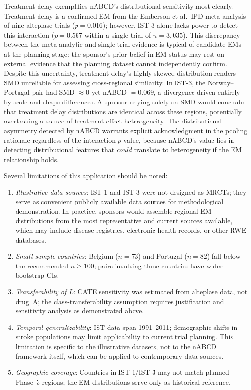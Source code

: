 \documentclass[AMA,Times1COL]{WileyNJDv5}
\begin{document}
Treatment delay exemplifies nABCD's distributional sensitivity most clearly. Treatment delay is a confirmed EM from the Emberson et al.\ IPD meta-analysis of nine alteplase trials ($p = 0.016$); however, IST-3 alone lacks power to detect this interaction ($p = 0.567$ within a single trial of $n = 3{,}035$). This discrepancy between the meta-analytic and single-trial evidence is typical of candidate EMs at the planning stage: the sponsor's prior belief in EM status may rest on external evidence that the planning dataset cannot independently confirm. Despite this uncertainty, treatment delay's highly skewed distribution renders SMD unreliable for assessing cross-regional similarity. In IST-3, the Norway--Portugal pair had SMD $\approx 0$ yet nABCD $= 0.069$, a divergence driven entirely by scale and shape differences. A sponsor relying solely on SMD would conclude that treatment delay distributions are identical across these regions, potentially overlooking a source of treatment effect heterogeneity. The distributional asymmetry detected by nABCD warrants explicit acknowledgment in the pooling rationale regardless of the interaction $p$-value, because nABCD's value lies in detecting distributional features that \emph{could} translate to heterogeneity if the EM relationship holds.

Several limitations of this application should be noted:
\begin{enumerate}[1.]
\item \emph{Illustrative data sources}: IST-1 and IST-3 were not designed as MRCTs; they serve as convenient publicly available data sources for methodological demonstration. In practice, sponsors would assemble regional EM distributions from the most representative and current sources available, which may include disease registries, electronic health records, or other RWE databases.
\item \emph{Small-sample countries}: Belgium ($n = 73$) and Portugal ($n = 82$) fall below the recommended $n \geq 100$; pairs involving these countries have wider bootstrap CIs.
\item \emph{Transferability of $L$}: CATE sensitivity was estimated from alteplase data, not drug~A; the class-transferability assumption requires justification and sensitivity analysis as demonstrated above.
\item \emph{Temporal generalizability}: IST data span 1991--2011; demographic shifts in stroke populations may limit applicability to current trial planning. This limitation is specific to the illustrative datasets, not to the nABCD framework itself, which can be applied to contemporary data sources.
\item \emph{Geographic coverage}: Countries in IST-1/IST-3 may not match planned Phase~3 regions; the EM distributions serve only as historical reference.
\end{enumerate}
\end{document}
